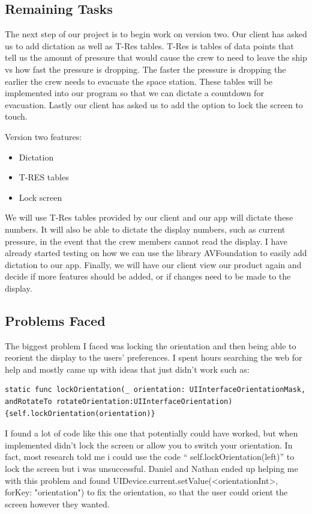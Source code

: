 \documentclass[onecolumn, draftclsnofoot,10pt, compsoc]{IEEEtran}
\begin{document}
\subsection{Remaining Tasks}
The next step of our project is to begin work on version two.
Our client has asked us to add dictation as well as T-Res tables.
T-Res is tables of data points that tell us the amount of pressure that would cause the crew to need to leave the ship vs how fast the pressure is dropping.
The faster the pressure is dropping the earlier the crew needs to evacuate the space station.
These tables will be implemented into our program so that we can dictate a countdown for evacuation.
Lastly our client has asked us to add the option to lock the screen to touch.

Version two features:
\begin{itemize}
\item Dictation
\item T-RES tables
\item Lock screen
\end{itemize}

We will use T-Res tables provided by our client and our app will dictate these numbers.
It will also be able to dictate the display numbers, such as current pressure, in the event that the crew members cannot read the display.
I have already started testing on how we can use the library AVFoundation to easily add dictation to our app.
Finally, we will have our client view our product again and decide if more features should be added, or if changes need to be made to the display.

\subsection{Problems Faced}
The biggest problem I faced was locking the orientation and then being able to reorient the display to the users’ preferences.
I spent hours searching the web for help and mostly came up with ideas that just didn't work such as:

\begin{lstlisting}
static func lockOrientation(_ orientation: UIInterfaceOrientationMask, andRotateTo rotateOrientation:UIInterfaceOrientation) {self.lockOrientation(orientation)}
\end{lstlisting}

    I found a lot of code like this one that potentially could have worked, but when implemented didn't lock the screen or allow you to switch your orientation.
    In fact, most research told me i could use the code “ self.lockOrientation(left)” to lock the screen but i was unsuccessful.
    Daniel and Nathan ended up helping me with this problem and found {UIDevice.current.setValue(<orientationInt>, forKey: "orientation")} to fix the orientation, so that the user could orient the screen however they wanted.
\end{document}
